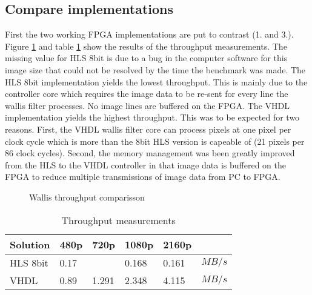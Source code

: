\subsection{Compare implementations}
First the two working FPGA implementations are put to contrast (1. and 3.).
Figure \ref{fig:benchmarkcompare} and table \ref{tab:throughputmeasuremetns}
show the results of the throughput measurements. The missing value for HLS 8bit
is due to a bug in the computer software for this image size that could not be
resolved by the time the benchmark was made. The HLS 8bit implementation yields
the lowest throughput. This is mainly due to the controller core which requires
the image data to be re-sent for every line the wallis filter processes. No
image lines are buffered on the FPGA. The VHDL implementation yields the
highest
throughput. This was to be expected for two
reasons. First, the VHDL wallis filter core can process pixels at one pixel per
clock cycle which is more than the 8bit HLS version is capeable of (21 pixels
per 86 clock cycles).
Second, the memory management was been greatly improved from the HLS to the VHDL
controller in that image data is buffered on the FPGA to reduce multiple
transmissions of image data from PC to FPGA. 

\begin{figure}[tb!]
    \centering
    \begin{adjustbox}{max width=\linewidth}
        
    \end{adjustbox}
    \caption{Wallis throughput comparisson}
    \label{fig:benchmarkcompare}
\end{figure}

\begin{table}[tb!]
    \centering
    \begin{tabular}{l l l l l l}
        \toprule
        Solution & 480p & 720p & 1080p & 2160p & \\
        \midrule
        HLS 8bit   & 0.17  &       & 0.168 & 0.161 & $MB/s$ \\
        VHDL       & 0.89  & 1.291 & 2.348 & 4.115 & $MB/s$\\
        \bottomrule
    \end{tabular}
    \caption{Throughput measurements}
    \label{tab:throughputmeasuremetns}
\end{table}


